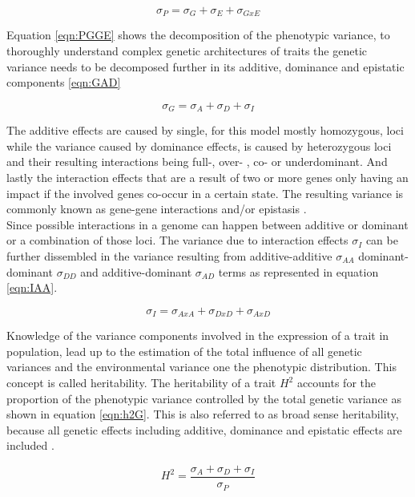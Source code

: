 \begin{equation}
 \sigma_{P} = \sigma_{G} + \sigma_{E} + \sigma_{GxE}
 \label{eqn:PGGE}
\end{equation}

Equation \ref{eqn:PGGE} shows the decomposition of the phenotypic variance, to thoroughly understand complex
genetic architectures of traits the genetic variance needs to be decomposed further in its additive, dominance
and epistatic components \ref{eqn:GAD}

\begin{equation}
 \sigma_{G} = \sigma_{A} + \sigma_{D} + \sigma_{I}
 \label{eqn:GAD}
\end{equation}

The additive effects are caused by single, for this model mostly homozygous, loci while the variance caused by
dominance effects, is caused by heterozygous loci and their resulting interactions being full-, over- , co- or
underdominant. And lastly the interaction effects that are a result of two or more genes only having an impact
if the involved genes co-occur in a certain state. The resulting variance is commonly known
as gene-gene interactions and/or epistasis \cite{falconer1996}. \\
Since possible interactions in a genome can happen between additive or dominant or a combination of those
loci. The variance due to interaction effects $\sigma_{I}$ can be further dissembled in the variance resulting
from additive-additive $\sigma_{AA}$ dominant-dominant $\sigma_{DD}$ and additive-dominant $\sigma_{AD}$ terms as
represented in equation \ref{eqn:IAA}.


\begin{equation}
 \sigma_{I} = \sigma_{AxA} + \sigma_{DxD} + \sigma_{AxD}
 \label{eqn:IAA}
\end{equation}

Knowledge of the variance components involved in the expression of a trait in population, lead up to the
estimation of the total influence of all genetic variances and the environmental variance one the phenotypic
distribution. This concept is called heritability. The heritability of a trait $H^2$ accounts for the
proportion of the phenotypic variance controlled by the total genetic variance as shown in equation
\ref{eqn:h2G}. This is also referred to as broad sense heritability, because all genetic effects including
additive, dominance and epistatic effects are included \cite{brooker1999genetics}.


\begin{equation}
 H^2 = \frac{\sigma_{A} + \sigma_{D} + \sigma_{I}}{\sigma_{P}}
 \label{eqn:h2G}
\end{equation}

